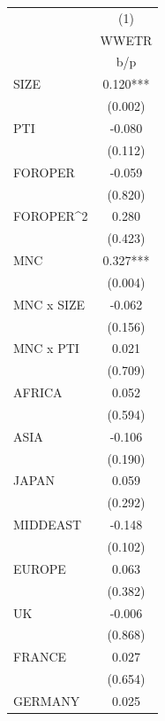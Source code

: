 {
\def\sym#1{\ifmmode^{#1}\else\(^{#1}\)\fi}
\begin{tabular}{l*{1}{c}}
\hline\hline
                    &\multicolumn{1}{c}{(1)}\\
                    &\multicolumn{1}{c}{WWETR}\\
                    &         b/p   \\
\hline
SIZE                &       0.120***\\
                    &     (0.002)   \\
PTI                 &      -0.080   \\
                    &     (0.112)   \\
FOROPER             &      -0.059   \\
                    &     (0.820)   \\
FOROPER^2           &       0.280   \\
                    &     (0.423)   \\
MNC                 &       0.327***\\
                    &     (0.004)   \\
MNC x SIZE          &      -0.062   \\
                    &     (0.156)   \\
MNC x PTI           &       0.021   \\
                    &     (0.709)   \\
AFRICA              &       0.052   \\
                    &     (0.594)   \\
ASIA                &      -0.106   \\
                    &     (0.190)   \\
JAPAN               &       0.059   \\
                    &     (0.292)   \\
MIDDEAST            &      -0.148   \\
                    &     (0.102)   \\
EUROPE              &       0.063   \\
                    &     (0.382)   \\
UK                  &      -0.006   \\
                    &     (0.868)   \\
FRANCE              &       0.027   \\
                    &     (0.654)   \\
GERMANY             &       0.025   \\

\end{tabular}}
